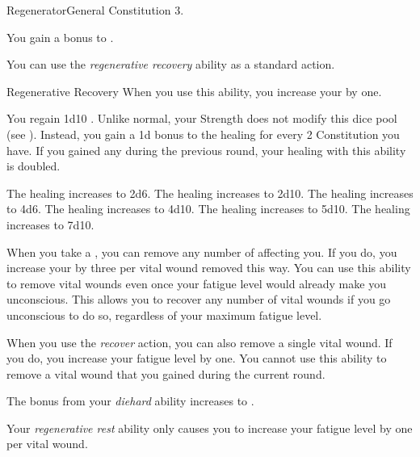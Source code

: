     \begin{feat}{Regenerator}{General}
        \featpre Constitution 3.

         You gain a  bonus to .

         You can use the \textit{regenerative recovery} ability as a standard action.
        \begin{activeability}{Regenerative Recovery}{}
            \rankline
            When you use this ability, you increase your  by one.

            You regain 1d10 \add {} .
            Unlike normal, your Strength does not modify this dice pool (see ).
            Instead, you gain a \plus1d bonus to the healing for every 2 Constitution you have.
            If you gained any  during the previous round, your healing with this ability is doubled.

            \rankline
             The healing increases to 2d6.
             The healing increases to 2d10.
             The healing increases to 4d6.
             The healing increases to 4d10.
             The healing increases to 5d10.
             The healing increases to 7d10.
        \end{activeability}

         When you take a , you can remove any number of  affecting you.
        If you do, you increase your  by three per vital wound removed this way.
        You can use this ability to remove vital wounds even once your fatigue level would already make you unconscious.
        This allows you to recover any number of vital wounds if you go unconscious to do so, regardless of your maximum fatigue level.

         When you use the \textit{recover} action, you can also remove a single vital wound.
        If you do, you increase your fatigue level by one.
        You cannot use this ability to remove a vital wound that you gained during the current round.

         The bonus from your \textit{diehard} ability increases to .

         Your \textit{regenerative rest} ability only causes you to increase your fatigue level by one per vital wound.
    \end{feat}

